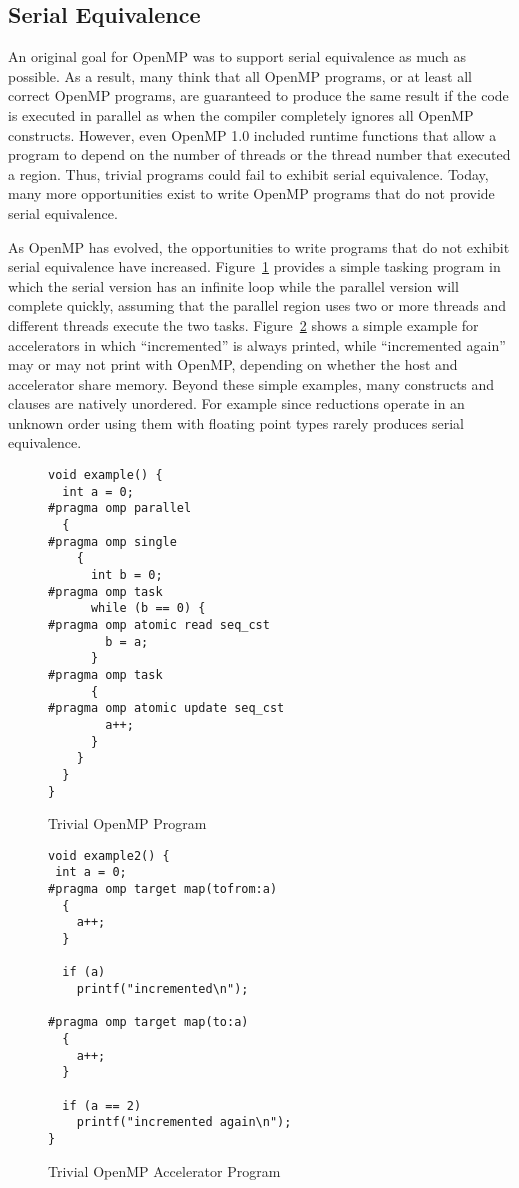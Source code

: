\subsection{Serial Equivalence}
\label{sub:serial_equivalence}

An original goal for OpenMP was to support serial equivalence as much
as possible. As a result, many think that all OpenMP programs, 
or at least all correct OpenMP programs, are guaranteed to produce the same 
result if the code is executed in parallel as when the compiler completely 
ignores all OpenMP constructs. However, even OpenMP 1.0 included runtime
functions that allow a program to depend on the number of threads or the
thread number that executed a region. Thus, trivial programs could
fail to exhibit serial equivalence. Today, many more opportunities exist
to write OpenMP programs that do not provide serial equivalence. 

As OpenMP has evolved, the opportunities to write programs that do not exhibit
serial equivalence have increased. Figure~\ref{fig:trivial_task} provides a
simple tasking program in which the serial version has an infinite loop while
the parallel version will complete quickly, assuming that the parallel region
uses two or more threads and different threads execute the two tasks.
Figure~\ref{fig:trivial_target} shows a simple example for accelerators in
which ``incremented'' is always printed, while ``incremented again'' may or may
not print with OpenMP, depending on whether the host and accelerator share
memory. Beyond these simple examples, many constructs and clauses are natively
unordered. For example since reductions operate in an unknown order using them
with floating point types rarely produces serial equivalence.

\begin{figure}
\begin{verbatim}
void example() {
  int a = 0;
#pragma omp parallel
  {
#pragma omp single
    {
      int b = 0;
#pragma omp task
      while (b == 0) {
#pragma omp atomic read seq_cst
        b = a;
      }
#pragma omp task
      {
#pragma omp atomic update seq_cst
        a++;
      }
    }
  }
}
\end{verbatim}
\caption{Trivial OpenMP Program\label{fig:trivial_task}}
\end{figure}

\begin{figure}
\begin{verbatim}
void example2() {
 int a = 0;
#pragma omp target map(tofrom:a)
  {
    a++;
  }

  if (a)
    printf("incremented\n");
  
#pragma omp target map(to:a)
  {
    a++;
  }

  if (a == 2)
    printf("incremented again\n");
}
\end{verbatim}
\caption{Trivial OpenMP Accelerator Program\label{fig:trivial_target}}
\end{figure}


